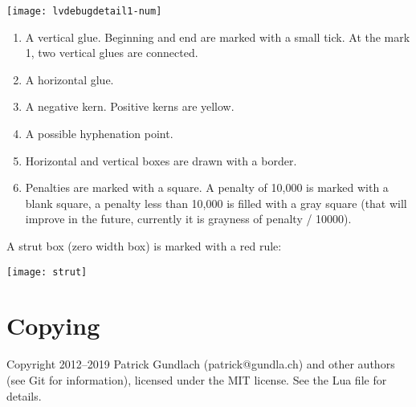\documentclass{article}
\begin{document}
\noindent\texttt{[image: lvdebugdetail1-num]}
\begin{enumerate}
	\item A vertical glue. Beginning and end are marked with a small tick. At the mark 1, two vertical glues are connected.
\item A horizontal glue.
\item A negative kern. Positive kerns are yellow.
\item A possible hyphenation point.
\item Horizontal and vertical boxes are drawn with a border.
\item Penalties are marked with a square. A penalty of 10,000 is marked with a blank square, a penalty less than 10,000 is filled with a gray square (that will improve in the future, currently it is grayness of penalty / 10000).
\end{enumerate}

A strut box (zero width box) is marked with a red rule:

\noindent\texttt{[image: strut]}



\section{Copying}

Copyright 2012–2019 Patrick Gundlach (patrick@gundla.ch) and other authors (see Git for information), licensed under the MIT license. See the Lua file for details.
\end{document}
